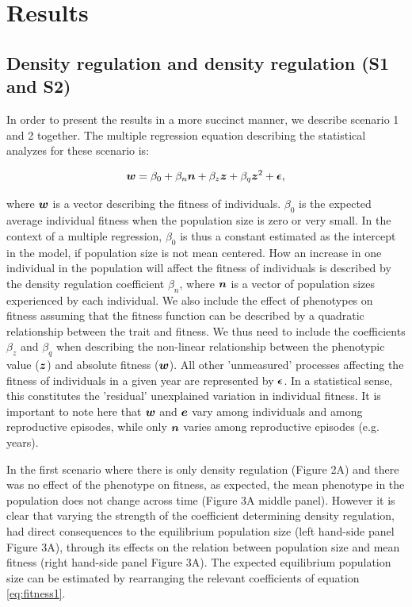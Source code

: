 \documentclass{article}
\begin{document}
\section{Results}

\subsection{Density regulation and density regulation (S1 and S2)}

In order to present the results in a more succinct manner, we describe scenario 1 and 2 together. The multiple regression equation describing the statistical analyzes for these scenario is:

\begin{equation} \label{eq:fitness1}
\vectorsym{w}=\beta_{0} +\beta_{n} \vectorsym{n} + \beta_{z} \vectorsym{z} + \beta_{q} \vectorsym{z}^2 + \vectorsym{\epsilon},
\end{equation}

\noindent where $\vectorsym{w}$ is a vector describing the fitness of individuals. $\beta_{0}$ is the expected average individual fitness when the population size is zero or very small. In the context of a multiple regression, $\beta_{0}$ is thus a constant estimated as the intercept in the model, if population size is not mean centered. How an increase in one individual in the population will affect the fitness of individuals is described by the density regulation coefficient $\beta_{n}$, where $\vectorsym{n}$ is a vector of population sizes experienced by each individual. We also include the effect of phenotypes on fitness assuming that the fitness function can be described by a quadratic relationship between the trait and fitness. We thus need to include the coefficients $\beta_{z}$ and $\beta_{q}$ when describing the non-linear relationship between the phenotypic value ($\vectorsym{z}$) and absolute fitness ($\vectorsym{w}$). All other 'unmeasured' processes affecting the fitness of individuals in a given year are represented by $ \vectorsym{\epsilon}$. In a statistical sense, this constitutes the 'residual' unexplained variation in individual fitness. It is important to note here that $\vectorsym{w}$ and $\vectorsym{e}$ vary among individuals and among reproductive episodes, while only $\vectorsym{n}$ varies among reproductive episodes (e.g. years).

In the first scenario where there is only density regulation (Figure 2A) and there was no effect of the phenotype on fitness, as expected, the mean phenotype in the population does not change across time (Figure 3A middle panel). However it is clear that varying the strength of the coefficient determining density regulation, had direct consequences to the equilibrium population size (left hand-side panel Figure 3A), through its effects on the relation between population size and mean fitness (right hand-side panel Figure 3A). The expected equilibrium population size can be estimated by rearranging the relevant coefficients of equation \ref{eq:fitness1}.
\end{document}

